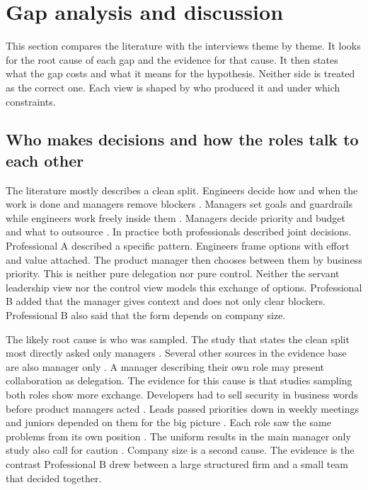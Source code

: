 \documentclass[conference]{IEEEtran}
\begin{document}
\section{Gap analysis and discussion}

This section compares the literature with the interviews theme by theme. It looks for the root cause of each gap and the evidence for that cause. It then states what the gap costs and what it means for the hypothesis. Neither side is treated as the correct one. Each view is shaped by who produced it and under which constraints.

\subsection{Who makes decisions and how the roles talk to each other}

The literature mostly describes a clean split. Engineers decide how and when the work is done and managers remove blockers \cite{nguyen2016c,kalluri2025}. Managers set goals and guardrails while engineers work freely inside them \cite{kurt2024}. Managers decide priority and budget and what to outsource \cite{weir2023,bibi2020}. In practice both professionals described joint decisions. Professional A described a specific pattern. Engineers frame options with effort and value attached. The product manager then chooses between them by business priority. This is neither pure delegation nor pure control. Neither the servant leadership view \cite{nguyen2016c} nor the control view \cite{kurt2024} models this exchange of options. Professional B added that the manager gives context and does not only clear blockers. Professional B also said that the form depends on company size.

The likely root cause is who was sampled. The study that states the clean split most directly asked only managers \cite{nguyen2016c}. Several other sources in the evidence base are also manager only \cite{suwarno2025,afshari2018,tarawneh2019,nguyen2016b}. A manager describing their own role may present collaboration as delegation. The evidence for this cause is that studies sampling both roles show more exchange. Developers had to sell security in business words before product managers acted \cite{weir2023}. Leads passed priorities down in weekly meetings and juniors depended on them for the big picture \cite{knauss2018}. Each role saw the same problems from its own position \cite{graetsch2023}. The uniform results in the main manager only study also call for caution \cite{nguyen2016c}. Company size is a second cause. The evidence is the contrast Professional B drew between a large structured firm and a small team that decided together.
\end{document}
